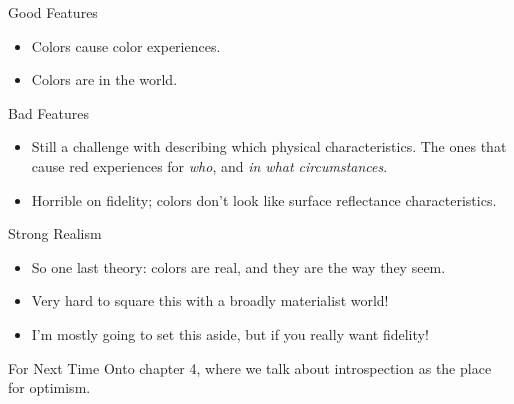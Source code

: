 \documentclass[
  17pt,
  letterpaper,
  ignorenonframetext,
  aspectratio=169,
]{beamer}
\providecommand{\tightlist}{%
  \setlength{\itemsep}{0pt}\setlength{\parskip}{0pt}}\usepackage{longtable,booktabs,array}
\begin{document}
\begin{frame}{Good Features}
\protect\hypertarget{good-features}{}
\begin{itemize}[<+->]
\tightlist
\item
  Colors cause color experiences.
\item
  Colors are in the world.
\end{itemize}
\end{frame}

\begin{frame}{Bad Features}
\protect\hypertarget{bad-features}{}
\begin{itemize}[<+->]
\tightlist
\item
  Still a challenge with describing which physical characteristics. The
  ones that cause red experiences for \emph{who}, and \emph{in what
  circumstances}.
\item
  Horrible on fidelity; colors don't look like surface reflectance
  characteristics.
\end{itemize}
\end{frame}

\begin{frame}{Strong Realism}
\protect\hypertarget{strong-realism}{}
\begin{itemize}[<+->]
\tightlist
\item
  So one last theory: colors are real, and they are the way they seem.
\item
  Very hard to square this with a broadly materialist world!
\item
  I'm mostly going to set this aside, but if you really want fidelity!
\end{itemize}
\end{frame}

\begin{frame}{For Next Time}
\protect\hypertarget{for-next-time}{}
Onto chapter 4, where we talk about introspection as the place for
optimism.
\end{frame}
\end{document}
